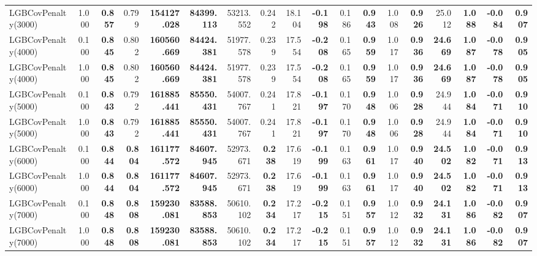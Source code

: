 \documentclass[11pt]{article}
\theoremstyle{plain}
\theoremstyle{definition}
\newcommand{\1}{\mathbf{1}}
\begin{document}
\begin{table}[htbp]
{\begin{tabular}{lrrrrrrrrrrrrrrrrr}
LGBCovPenalty(3000) & 1.000 & \textbf{0.857} & 0.799 & \textbf{154127.028} & \textbf{84399.113} & 53213.552 & 0.242 & 18.104 & \textbf{-0.198} & 0.186 & \textbf{0.943} & 1.008 & \textbf{0.926} & 25.012 & \textbf{1.088} & \textbf{-0.084} & \textbf{0.907} \\
LGBCovPenalty(4000) & 0.100 & \textbf{0.845} & 0.802 & \textbf{160560.669} & \textbf{84424.381} & 51977.578 & 0.239 & 17.554 & \textbf{-0.208} & 0.165 & \textbf{0.959} & 1.017 & \textbf{0.936} & \textbf{24.669} & \textbf{1.087} & \textbf{-0.078} & \textbf{0.905} \\
LGBCovPenalty(4000) & 1.000 & \textbf{0.845} & 0.802 & \textbf{160560.669} & \textbf{84424.381} & 51977.578 & 0.239 & 17.554 & \textbf{-0.208} & 0.165 & \textbf{0.959} & 1.017 & \textbf{0.936} & \textbf{24.669} & \textbf{1.087} & \textbf{-0.078} & \textbf{0.905} \\
LGBCovPenalty(5000) & 0.100 & \textbf{0.843} & 0.792 & \textbf{161885.441} & \textbf{85550.431} & 54007.767 & 0.241 & 17.821 & \textbf{-0.197} & 0.170 & \textbf{0.948} & 1.006 & \textbf{0.928} & 24.944 & \textbf{1.084} & \textbf{-0.071} & \textbf{0.910} \\
LGBCovPenalty(5000) & 1.000 & \textbf{0.843} & 0.792 & \textbf{161885.441} & \textbf{85550.431} & 54007.767 & 0.241 & 17.821 & \textbf{-0.197} & 0.170 & \textbf{0.948} & 1.006 & \textbf{0.928} & 24.944 & \textbf{1.084} & \textbf{-0.071} & \textbf{0.910} \\
LGBCovPenalty(6000) & 0.100 & \textbf{0.844} & \textbf{0.804} & \textbf{161177.572} & \textbf{84607.945} & 52973.671 & \textbf{0.238} & 17.619 & \textbf{-0.199} & 0.163 & \textbf{0.961} & 1.017 & \textbf{0.940} & \textbf{24.502} & \textbf{1.082} & \textbf{-0.071} & \textbf{0.913} \\
LGBCovPenalty(6000) & 1.000 & \textbf{0.844} & \textbf{0.804} & \textbf{161177.572} & \textbf{84607.945} & 52973.671 & \textbf{0.238} & 17.619 & \textbf{-0.199} & 0.163 & \textbf{0.961} & 1.017 & \textbf{0.940} & \textbf{24.502} & \textbf{1.082} & \textbf{-0.071} & \textbf{0.913} \\
LGBCovPenalty(7000) & 0.100 & \textbf{0.848} & \textbf{0.808} & \textbf{159230.081} & \textbf{83588.853} & 50610.102 & \textbf{0.234} & 17.217 & \textbf{-0.215} & 0.151 & \textbf{0.957} & 1.012 & \textbf{0.932} & \textbf{24.131} & \textbf{1.086} & \textbf{-0.082} & \textbf{0.907} \\
LGBCovPenalty(7000) & 1.000 & \textbf{0.848} & \textbf{0.808} & \textbf{159230.081} & \textbf{83588.853} & 50610.102 & \textbf{0.234} & 17.217 & \textbf{-0.215} & 0.151 & \textbf{0.957} & 1.012 & \textbf{0.932} & \textbf{24.131} & \textbf{1.086} & \textbf{-0.082} & \textbf{0.907} \\

\end{tabular}}
\end{table}
\end{document}
